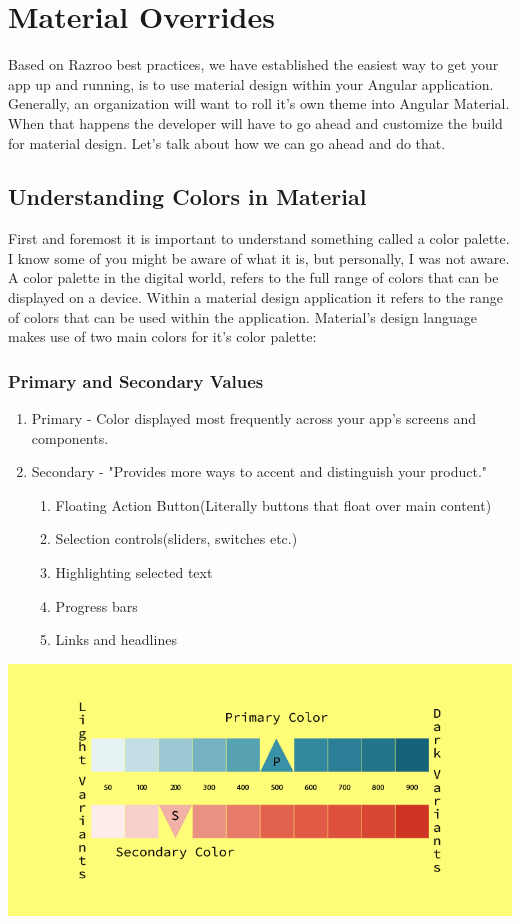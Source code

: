 
\section{ Material Overrides }

Based on Razroo best practices, we have established the easiest way to get 
your app up and running, is to use material design within your Angular 
application. Generally, an organization will want to roll it's own theme into 
Angular Material. When that happens the developer will have to go ahead and 
customize the build for material design. Let's talk about how we can go ahead 
and do that. 

\subsection{Understanding Colors in Material}
First and foremost it is important to understand something called a color 
palette. I know some of you might be aware of what it is, but personally, I was
not aware. A color palette in the digital world, refers to the full range of 
colors that can be displayed on a device. Within a material design application 
it refers to the range of colors that can be used within the application. 
Material's design language makes use of two main colors for it's color palette: 

\subsubsection{Primary and Secondary Values}
\begin{enumerate}
  \item Primary - Color displayed most frequently across your app's screens and
  components. 
  \item Secondary - "Provides more ways to accent and distinguish your product."
  \begin{enumerate}
    \item Floating Action Button(Literally buttons that float over main content)
    \item Selection controls(sliders, switches etc.)
    \item Highlighting selected text
    \item Progress bars
    \item Links and headlines
  \end{enumerate}
\end{enumerate}

\includegraphics[width=6in]{design-language-system/material-overrides/material-design-palette.png}

